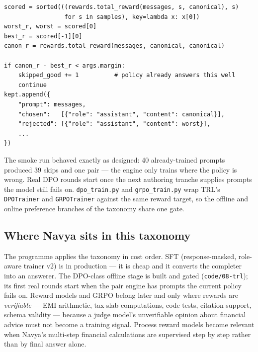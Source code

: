 \begin{lstlisting}[style=shadedpython,basicstyle=\scriptsize\ttfamily]
scored = sorted(((rewards.total_reward(messages, s, canonical), s)
                 for s in samples), key=lambda x: x[0])
worst_r, worst = scored[0]
best_r = scored[-1][0]
canon_r = rewards.total_reward(messages, canonical, canonical)

if canon_r - best_r < args.margin:
    skipped_good += 1          # policy already answers this well
    continue
kept.append({
    "prompt": messages,
    "chosen":   [{"role": "assistant", "content": canonical}],
    "rejected": [{"role": "assistant", "content": worst}],
    ...
})
\end{lstlisting}

The smoke run behaved exactly as designed: 40 already-trained prompts
produced 39 skips and one pair --- the engine only trains where the
policy is wrong. Real DPO rounds start once the next authoring tranche
supplies prompts the model still fails on.
\texttt{dpo\_train.py} and \texttt{grpo\_train.py} wrap TRL's
\texttt{DPOTrainer} and \texttt{GRPOTrainer} against the same reward
target, so the offline and online preference branches of the taxonomy
share one gate.

\subsection{Where Navya sits in this taxonomy}

The programme applies the taxonomy in cost order. SFT (response-masked,
role-aware trainer v2) is in production --- it is cheap and it converts
the completer into an answerer. The DPO-class offline stage is built and
gated (\texttt{code/08-trl}); its first real rounds start when the pair
engine has prompts the current policy fails on. Reward models and GRPO belong later and only where rewards
are \emph{verifiable} --- EMI arithmetic, tax-slab computations, code
tests, citation support, schema validity --- because a judge model's
unverifiable opinion about financial advice must not become a training
signal. Process reward models become relevant when Navya's multi-step
financial calculations are supervised step by step rather than by final
answer alone.
